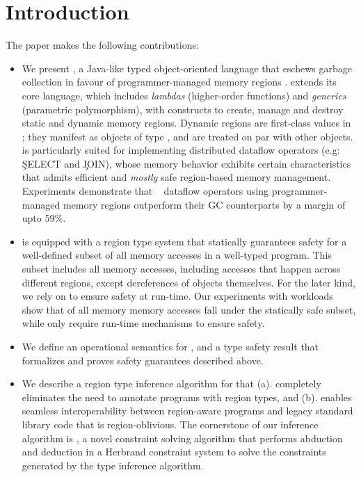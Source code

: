 \section{Introduction}
\label{sec:introduction}

The paper makes the following contributions:

\begin{itemize}
  \item We present \name, a Java-like typed object-oriented language
  that eschews garbage collection in favour of programmer-managed
  memory regions . \name extends its core language, which includes
  \emph{lambdas} (higher-order functions) and \emph{generics}
  (parametric polymorphism), with constructs to create, manage and
  destroy static and dynamic memory regions. Dynamic regions are
  first-class values in \name; they manifest as objects of type
  , and are treated on par with other objects. \name is
  particularly suited for implementing distributed dataflow operators
  (e.g: \c{SELECT} and \c{JOIN}), whose memory behavior exhibits
  certain characteristics that admits efficient and \emph{mostly} safe
  region-based memory management. Experiments demonstrate that
  \naiad~\cite{naiad} dataflow operators using programmer-managed
  memory regions outperform their GC counterparts by a margin of upto
  59\%. 

  \item \name is equipped with a region type system that statically
  guarantees safety for a well-defined subset of all memory accesses
  in a well-typed program. This subset includes all memory accesses,
  including accesses that happen across different regions, except
  dereferences of  objects themselves. For the later kind,
  we rely on  to ensure safety at run-time.
  Our experiments with \naiad workloads show that  of all
  memory memory accesses fall under the statically safe subset, while
  only  require run-time mechanisms to ensure safety.

  \item We define an operational semantics for \name, and a type
  safety result that formalizes and proves safety guarantees described
  above.

  \item We describe a region type inference algorithm for \name that
  (a). completely eliminates the need to annotate \name programs with
  region types, and (b). enables seamless interoperability between
  region-aware \name programs and legacy standard library code that is
  region-oblivious. The cornerstone of our inference algorithm is
  \csolve, a novel constraint solving algorithm that performs
  abduction and deduction in a Herbrand constraint system to solve the
  constraints generated by the type inference algorithm.


\end{itemize}
